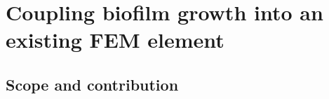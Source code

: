 %
%
%
\providecommand{\ansysfigdir}{../assets/}

\chapter{Coupling biofilm growth into an existing FEM element}
\label{ch:ansys}

\section{Scope and contribution}
\label{sec:ch5-scope}

